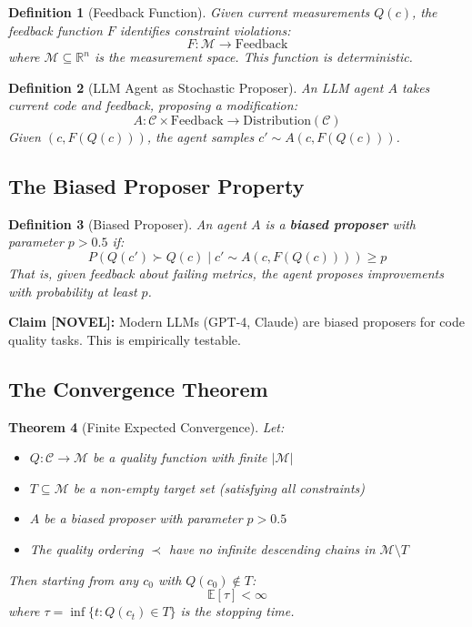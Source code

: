 \documentclass[11pt,a4paper]{article}
\newtheorem{theorem}{Theorem}[section]
\newtheorem{definition}[theorem]{Definition}
\begin{document}
\begin{definition}[Feedback Function]
Given current measurements $Q(c)$, the feedback function $F$ identifies constraint violations:
\[
F: \mathcal{M} \to \text{Feedback}
\]
where $\mathcal{M} \subseteq \mathbb{R}^n$ is the measurement space. This function is deterministic.
\end{definition}

\begin{definition}[LLM Agent as Stochastic Proposer]
An LLM agent $A$ takes current code and feedback, proposing a modification:
\[
A: \mathcal{C} \times \text{Feedback} \to \text{Distribution}(\mathcal{C})
\]
Given $(c, F(Q(c)))$, the agent samples $c' \sim A(c, F(Q(c)))$.
\end{definition}

\subsection{The Biased Proposer Property}

\begin{definition}[Biased Proposer]
\label{def:biased-proposer}
An agent $A$ is a \textbf{biased proposer} with parameter $p > 0.5$ if:
\[
P(Q(c') \succ Q(c) \mid c' \sim A(c, F(Q(c)))) \geq p
\]
That is, given feedback about failing metrics, the agent proposes improvements with probability at least $p$.
\end{definition}

\textbf{Claim [NOVEL]:} Modern LLMs (GPT-4, Claude) are biased proposers for code quality tasks. This is empirically testable.

\subsection{The Convergence Theorem}

\begin{theorem}[Finite Expected Convergence]
\label{thm:convergence}
Let:
\begin{itemize}
  \item $Q: \mathcal{C} \to \mathcal{M}$ be a quality function with finite $|\mathcal{M}|$
  \item $T \subseteq \mathcal{M}$ be a non-empty target set (satisfying all constraints)
  \item $A$ be a biased proposer with parameter $p > 0.5$
  \item The quality ordering $\prec$ have no infinite descending chains in $\mathcal{M} \setminus T$
\end{itemize}

Then starting from any $c_0$ with $Q(c_0) \notin T$:
\[
\mathbb{E}[\tau] < \infty
\]
where $\tau = \inf\{t : Q(c_t) \in T\}$ is the stopping time.
\end{theorem}
\end{document}
